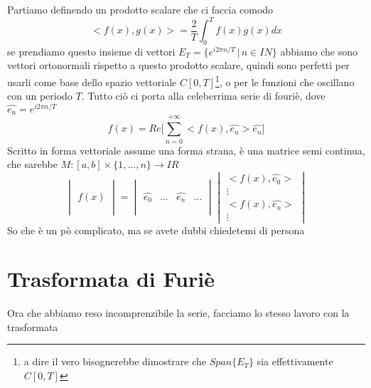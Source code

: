 \documentclass[11pt,a4paper]{article}
\theoremstyle{definition}
\theoremstyle{plain}
\theoremstyle{plain}
\begin{document}
			Partiamo definendo un prodotto scalare che ci faccia comodo
			\begin{equation}
				<f(x),g(x)>=\frac{2}{T}\int_0^T f(x)g(x)dx
			\end{equation}
			se prendiamo questo insieme di vettori $E_T=\{e^{i2\pi n/ T} \, | \, n \in I\!\! N\}$ abbiamo che sono vettori ortonormali rispetto a questo prodotto scalare, quindi sono perfetti per usarli come base dello spazio vettoriale $C[0,T]$\footnote{a dire il vero bisognerebbe dimostrare che $Span\{E_T\}$ sia effettivamente $C[0,T]$}, o per le funzioni che oscillano con un periodo $T$.\newline
			Tutto ciò ci porta alla celeberrima serie di fouriè, dove $\widehat{e_n}=e^{i2\pi n/ T}$
			\begin{equation}
			\label{serieFuriè}
				f(x)=Re\Bigg[\sum_{n=0}^{+\infty} <f(x),\widehat{e_n}>\widehat{e_n}\Bigg]
			\end{equation}
			Scritto in forma vettoriale assume una forma strana, è una matrice semi continua, che sarebbe $M:[a,b]\times \{1,\dots,n\}\rightarrow I\!R$
			\begin{equation}
				\begin{vmatrix}
					\,\\
					\,\\
					f(x)\\
					\,\\
					\,
				\end{vmatrix}
				=
				\begin{vmatrix}
					\, & & &\\
					\, & & &\\
					\widehat{e_0}& \dots & \widehat{e_n}&\dots\\
					\, & & &\\
					\, & & &
				\end{vmatrix}
				\begin{vmatrix}
					<f(x),\widehat{e_0}>\\
					\vdots\\
					<f(x),\widehat{e_n}>\\
					\vdots
				\end{vmatrix}
			\end{equation}
			So che è un pò complicato, ma se avete dubbi chiedetemi di persona


		\section{Trasformata di Furiè}
			Ora che abbiamo reso incomprenzibile la serie, facciamo lo stesso lavoro con la trasformata
\end{document}
